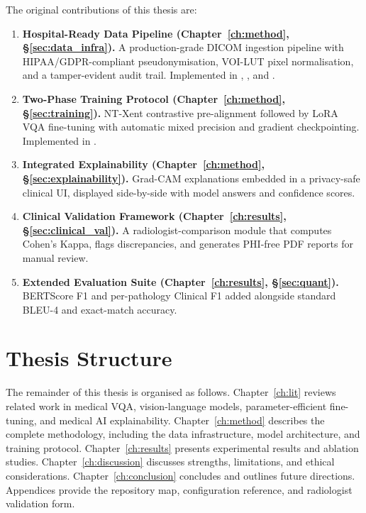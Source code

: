 The original contributions of this thesis are:

\begin{enumerate}[label=\textbf{C\arabic*.}]
  \item \textbf{Hospital-Ready Data Pipeline (Chapter~\ref{ch:method},
        \S\ref{sec:data_infra}).}
        A production-grade DICOM ingestion pipeline with HIPAA/GDPR-compliant
        pseudonymisation, VOI-LUT pixel normalisation, and a tamper-evident
        audit trail. Implemented in ,
        , and .

  \item \textbf{Two-Phase Training Protocol
        (Chapter~\ref{ch:method}, \S\ref{sec:training}).}
        NT-Xent contrastive pre-alignment followed by LoRA VQA fine-tuning
        with automatic mixed precision and gradient checkpointing.
        Implemented in .

  \item \textbf{Integrated Explainability
        (Chapter~\ref{ch:method}, \S\ref{sec:explainability}).}
        Grad-CAM explanations embedded in a privacy-safe clinical UI,
        displayed side-by-side with model answers and confidence scores.

  \item \textbf{Clinical Validation Framework
        (Chapter~\ref{ch:results}, \S\ref{sec:clinical_val}).}
        A radiologist-comparison module that computes Cohen's Kappa, flags
        discrepancies, and generates PHI-free PDF reports for manual review.

  \item \textbf{Extended Evaluation Suite
        (Chapter~\ref{ch:results}, \S\ref{sec:quant}).}
        BERTScore F1 and per-pathology Clinical F1 added alongside
        standard BLEU-4 and exact-match accuracy.
\end{enumerate}

\section{Thesis Structure}
\label{sec:structure}

The remainder of this thesis is organised as follows.
Chapter~\ref{ch:lit} reviews related work in medical VQA, vision-language
models, parameter-efficient fine-tuning, and medical AI explainability.
Chapter~\ref{ch:method} describes the complete \medxplain{} methodology,
including the data infrastructure, model architecture, and training protocol.
Chapter~\ref{ch:results} presents experimental results and ablation studies.
Chapter~\ref{ch:discussion} discusses strengths, limitations, and ethical
considerations. Chapter~\ref{ch:conclusion} concludes and outlines future
directions. Appendices provide the repository map, configuration reference,
and radiologist validation form.
